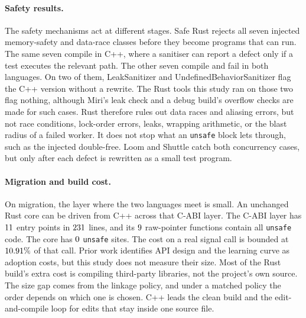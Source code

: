 \documentclass[english,oneside,a4paper,censored,csm,software-track-2020]{HYthesisML}
\begin{document}
\paragraph{Safety results.}
The safety mechanisms act at different stages. Safe Rust rejects all seven
injected memory-safety and data-race classes before they become programs that
can run. The same seven compile in C++, where a sanitiser can report a defect
only if a test executes the relevant path. The other seven compile and fail in
both languages. On two of them, LeakSanitizer and UndefinedBehaviorSanitizer
flag the C++ version without a rewrite. The Rust tools this study ran on those
two flag nothing, although Miri's leak check and a debug build's overflow
checks are made for such cases. Rust therefore rules out data races and
aliasing errors, but not race conditions, lock-order errors, leaks, wrapping
arithmetic, or the blast radius of a failed worker. It does not stop what an
\texttt{unsafe} block lets through, such as the injected double-free. Loom and
Shuttle catch both concurrency cases, but only after each defect is rewritten as
a small test program.

\paragraph{Migration and build cost.}
On migration, the layer where the two languages meet is small. An unchanged
Rust core can be driven from C++ across that C-ABI layer. The
C-ABI layer has $11$ entry points in $231$ lines, and its
$9$ raw-pointer functions contain all \texttt{unsafe} code. The
core has $0$ \texttt{unsafe} sites. The cost on a real signal call is
bounded at $10.91\%$ of that call.
Prior work identifies API design and the learning curve as adoption costs, but
this study does not measure their size.
Most of the Rust build's extra cost is compiling third-party libraries, not the
project's own source. The size gap comes from the linkage policy, and under a
matched policy the order depends on which one is chosen. C++ leads the clean build and the
edit-and-compile loop for edits that stay inside one source file.
\end{document}
